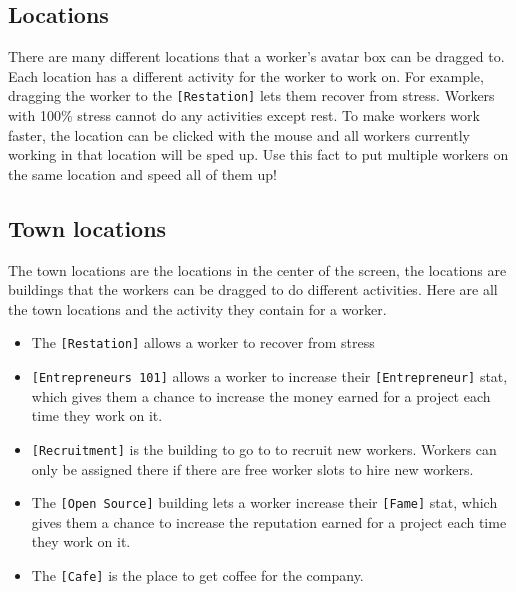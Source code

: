 \documentclass[11pt]{article}
\begin{document}
\begin{multicols}{2}
\section{Locations}
\noindent
There are many different locations that a worker's avatar box can be dragged to. Each location has a different activity for the worker to work on. For example, dragging the worker to the \texttt{[Restation]} lets them recover from stress. Workers with 100\% stress cannot do any activities except rest. To make workers work faster, the location can be clicked with the mouse and all workers currently working in that location will be sped up. Use this fact to put multiple workers on the same location and speed all of them up!

\subsection{Town locations}
\noindent
The town locations are the locations in the center of the screen, the locations are buildings that the workers can be dragged to do different activities. Here are all the town locations and the activity they contain for a worker.
\begin{itemize}
\itemsep0em
\item The \texttt{[Restation]} allows a worker to recover from stress
\item \texttt{[Entrepreneurs 101]} allows a worker to increase their \texttt{[Entrepreneur]} stat, which gives them a chance to increase the money earned for a project each time they work on it.
\item \texttt{[Recruitment]} is the building to go to to recruit new workers. Workers can only be assigned there if there are free worker slots to hire new workers.
\item The \texttt{[Open Source]} building lets a worker increase their \texttt{[Fame]} stat, which gives them a chance to increase the reputation earned for a project each time they work on it.
\item The \texttt{[Cafe]} is the place to get coffee for the company.
\end{itemize}

\end{multicols}
\end{document}
